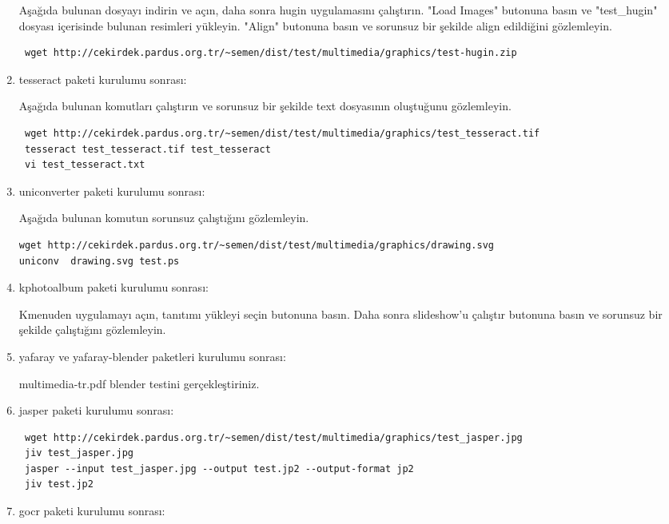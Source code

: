 \documentclass[a4paper,10pt]{article}
\begin{document}
\begin{enumerate}
Aşağıda bulunan dosyayı indirin ve açın, daha sonra hugin uygulamasını çalıştırın. "Load Images" butonuna basın ve "test\_hugin" dosyası içerisinde bulunan resimleri yükleyin. "Align" butonuna basın ve sorunsuz bir şekilde align edildiğini gözlemleyin. 

\begin{verbatim}
 wget http://cekirdek.pardus.org.tr/~semen/dist/test/multimedia/graphics/test-hugin.zip
\end{verbatim}


\item tesseract paketi kurulumu sonrası:

Aşağıda bulunan komutları çalıştırın ve sorunsuz bir şekilde text dosyasının oluştuğunu gözlemleyin.
\begin{verbatim}
 wget http://cekirdek.pardus.org.tr/~semen/dist/test/multimedia/graphics/test_tesseract.tif
 tesseract test_tesseract.tif test_tesseract
 vi test_tesseract.txt
\end{verbatim}

\item uniconverter paketi kurulumu sonrası:

Aşağıda bulunan komutun sorunsuz çalıştığını gözlemleyin.
\begin{verbatim}
wget http://cekirdek.pardus.org.tr/~semen/dist/test/multimedia/graphics/drawing.svg
uniconv  drawing.svg test.ps
\end{verbatim}


\item kphotoalbum paketi kurulumu sonrası:

Kmenuden uygulamayı açın, tanıtımı yükleyi seçin butonuna basın. Daha sonra slideshow'u çalıştır butonuna basın ve sorunsuz bir şekilde çalıştığını gözlemleyin.

\item yafaray ve yafaray-blender paketleri kurulumu sonrası:

multimedia-tr.pdf blender testini gerçekleştiriniz.
\item jasper paketi kurulumu sonrası:

\begin{verbatim}
 wget http://cekirdek.pardus.org.tr/~semen/dist/test/multimedia/graphics/test_jasper.jpg
 jiv test_jasper.jpg
 jasper --input test_jasper.jpg --output test.jp2 --output-format jp2
 jiv test.jp2
\end{verbatim}


 \item gocr paketi kurulumu sonrası:


\end{enumerate}
\end{document}
